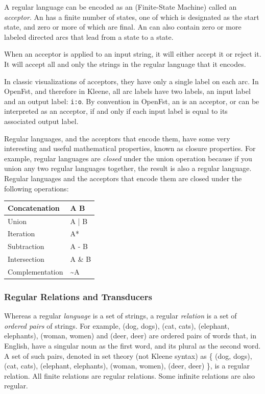 A regular language can be encoded as an \fsm{} (Finite-State Machine) called an
\emph{acceptor}.  An \fsm{} has a finite number of states, one of which is designated as the
start state, and zero or more of which are final.  An \fsm{} can also contain zero or
more labeled directed arcs that lead from a state to a state.

When an acceptor is applied to an input string, it will either accept it or reject it.  It
will accept all and only the strings in the regular language that it encodes.

In classic visualizations of acceptors, they have only a single label on
each arc.  In OpenFst, and therefore in Kleene, all arc labels have two labels, an input
label and an output label: \verb!i:o!.  By convention in OpenFst, an \fsm{} is an acceptor,
or can be interpreted as an acceptor,
if and only if each input label is equal to its associated output label.

Regular languages, and the acceptors that encode them, have some very interesting and
useful
mathematical properties, known as closure properties.  For example, regular languages are
\emph{closed} under the union operation because if you union any two regular languages together, the
result is also a regular language.  Regular languages and the acceptors that
encode them are closed under the following
operations:

\vspace{4mm}

\begin{tabular}{|l|l|}
\hline
Concatenation 	& A B \\
\hline
Union         	& A | B \\
\hline
Iteration	  	& A*\\
\hline
Subtraction		& A - B\\
\hline
Intersection	& A \& B\\
\hline
Complementation		& \~{}A\\
\hline
\end{tabular}

\subsubsection{Regular Relations and Transducers}

Whereas a regular \emph{language} is a set of strings, a regular \emph{relation}
is a set of
\emph{ordered pairs}
of strings.  For example, (dog, dogs), (cat, cats), (elephant, elephants), (woman, women)
and (deer, deer)
are ordered pairs of words that, in English, have a singular noun as the first word, and its plural
as the second word.  A set of such pairs, denoted in set theory (not Kleene syntax) as \{ (dog, dogs), (cat, cats), (elephant,
elephants), (woman, women), (deer, deer) \}, is a regular relation.  All finite relations are
regular relations.  Some infinite relations are also regular.

